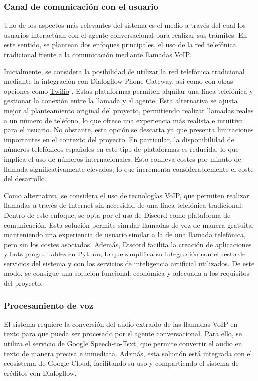         \subsubsection{Canal de comunicación con el usuario}
            Uno de los aspectos más relevantes del sistema es el medio a través del cual los usuarios interactúan con el agente conversacional para realizar sus trámites. 
            En este sentido, se plantean dos enfoques principales, el uso de la red telefónica tradicional frente a la comunicación mediante llamadas VoIP.
            
            Inicialmente, se considera la posibilidad de utilizar la red telefónica tradicional mediante la integración con Dialogflow Phone Gateway, así como con otras opciones como \href{https://www.twilio.com/}{Twilio} \cite{ref12}. 
            Estas plataformas permiten alquilar una línea telefónica y gestionar la conexión entre la llamada y el agente. 
            Esta alternativa se ajusta mejor al planteamiento original del proyecto, permitiendo realizar llamadas reales a un número de teléfono, lo que ofrece una experiencia más realista e intuitiva para el usuario. 
            No obstante, esta opción se descarta ya que presenta limitaciones importantes en el contexto del proyecto. 
            En particular, la disponibilidad de números telefónicos españoles en este tipo de plataformas es reducida, lo que implica el uso de números internacionales. 
            Esto conlleva costes por minuto de llamada significativamente elevados, lo que incrementa considerablemente el coste del desarrollo. 

            Como alternativa, se considera el uso de tecnologías VoIP, que permiten realizar llamadas a través de Internet sin necesidad de una línea telefónica tradicional. 
            Dentro de este enfoque, se opta por el uso de Discord como plataforma de comunicación. 
            Esta solución permite simular llamadas de voz de manera gratuita, manteniendo una experiencia de usuario similar a la de una llamada telefónica, pero sin los costes asociados. 
            Además, Discord facilita la creación de aplicaciones y bots programables en Python, lo que simplifica su integración con el resto de servicios del sistema y con los servicios de inteligencia artificial utilizados. 
            De este modo, se consigue una solución funcional, económica y adecuada a los requisitos del proyecto. 

        \subsubsection{Procesamiento de voz}
            El sistema requiere la conversión del audio extraído de las llamadas VoIP en texto para que pueda ser procesado por el agente conversacional. 
            Para ello, se utiliza el servicio de Google Speech-to-Text, que permite convertir el audio en texto de manera precisa e inmediata. 
            Además, esta solución está integrada con el ecosistema de Google Cloud, facilitando su uso y compartiendo el sistema de créditos con Dialogflow. 

